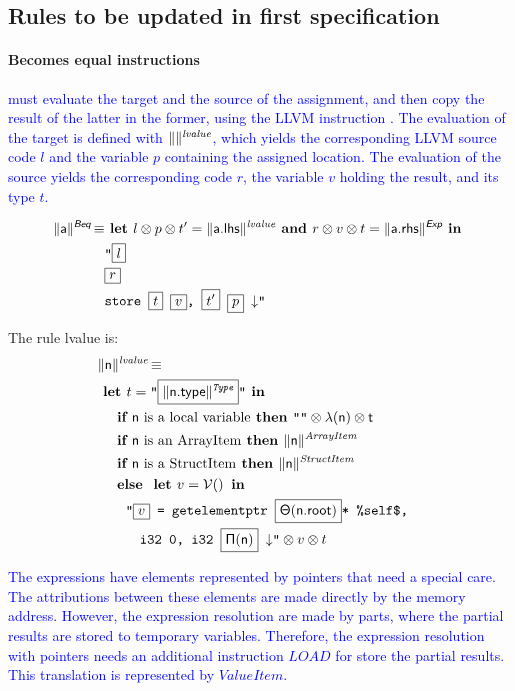 

\subsection{Rules to be updated in first specification}

\paragraph{Becomes equal instructions} \textcolor{blue}{ must evaluate the
 target and the source of the assignment, and then copy the result of the 
latter in the former, using the LLVM instruction . The evaluation 
of the target is defined with $\lVert \textsf{} \rVert^{\textit{lvalue}}$, which yields the corresponding 
LLVM source code $l$ and the variable $p$ containing the assigned location. The 
evaluation of the source yields the corresponding code $r$, the variable $v$ 
holding the result, and its type $t$. }

\begin{align*}
\begin{split}
  \trad{a}{\B{Beq}} \isdef
  & \LET l \sep p \sep t'= \trad{a.lhs}{lvalue} \AND r \sep v \sep t = \trad{a.rhs}{\B{Exp}} \IN \\
  & \llvm{"\PH{l}} \\
  & \llvm{\PH{r}} \\
  & \llvm{store \PH{t} \PH{v}, \PH{t'} \PH{p} \nl"}
\end{split}
\end{align*}

The rule lvalue is:
\begin{align*}
\lefteqn{\trad{n}{lvalue} \isdef} \\
& \LET t = \llvm{"\PH{\trad{\B{n.type}}{Type}}"} \IN \\
& \quad \IF \mbox{\B{n} is a local variable} \THEN \llvm{""} \sep \local(\B{n}) \sep t \\
& \quad \IF \mbox{\B{n} is an ArrayItem} \THEN  \trad{n}{ArrayItem} \\
& \quad \IF \mbox{\B{n} is a StructItem} \THEN  \trad{n}{StructItem} \\
& \quad \ELSE \LET v = \variable \IN \\
& \quad \quad \llvm{"\PH{v} = getelementptr \PH{\state(\B{n.root})}* \%self\$,} \\
& \quad \quad \quad \llvm{i32 0, i32 \PH{\idx(\B{n})} \nl"} \sep v \sep t
\end{align*}

\textcolor{blue}{ The expressions have elements represented by pointers that need a special 
care. The attributions between these elements are made  directly by the memory 
address.  However, the expression resolution are made by parts, where the 
partial results are stored to temporary variables. Therefore, the expression 
resolution with pointers needs an additional instruction $LOAD$ for store the 
partial results. This translation is represented by $ValueItem$.} 

